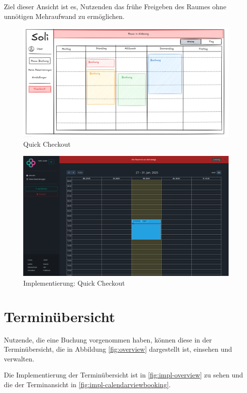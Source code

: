 Ziel dieser Ansicht ist es, Nutzenden das frühe Freigeben des Raumes ohne unnötigen Mehraufwand zu ermöglichen.
\begin{figure}[ht]
    \centering
    \includegraphics[width=\textwidth]{figures/mockup/calendar_checkout}
    \caption{Quick Checkout}
    \label{fig:checkout}
\end{figure}
\clearpage

\begin{figure}[ht]
    \centering
    \includegraphics[width=\textwidth]{figures/impl-views/calendar_checkout} %
    \caption{Implementierung: Quick Checkout}
    \label{fig:impl-checkout}
\end{figure}
\clearpage


\section{Terminübersicht}
Nutzende, die eine Buchung vorgenommen haben, können diese in der Terminübersicht,
die in Abbildung \ref{fig:overview} dargestellt ist, einsehen und verwalten.

Die Implementierung der Terminübersicht ist in \ref{fig:impl-overview} zu sehen und die der Terminansicht in \ref{fig:impl-calendarviewbooking}.

